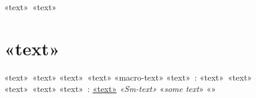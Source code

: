 «text»~«text»

\chapter{«text»}
\label{s:1}
«text»~«text»
«text»~«text»
«macro-text»
«text»~:
«text»~«text»
«text»~«text»
«text»~:
\hyperref[s:1]{«text»}
\emph{«Sm-text»}
«\emph{some text}»
«»

